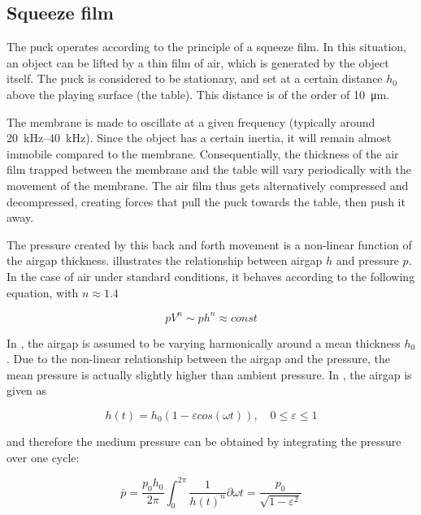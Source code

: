 \subsection{Squeeze film}
\label{sub:squeezefilm}

The puck operates according to the principle of a squeeze film. In this
situation, an object can be lifted by a thin film of air, which is generated by
the object itself. The puck is considered to be stationary, and set at a certain
distance $h_0$ above the playing surface (the table). This distance is of the
order of \SI{10}{\micro\metre}.

The membrane is made to oscillate at a given frequency (typically around
\SIrange{20}{40}{\kilo\hertz}). Since the object has a certain inertia, it will
remain almost immobile compared to the membrane. Consequentially, the thickness
of the air film trapped between the membrane and the table will vary
periodically with the movement of the membrane. The air film thus gets
alternatively compressed and decompressed, creating forces that pull the puck
towards the table, then push it away. 

The pressure created by this back and forth movement is a non-linear function of
the airgap thickness.  illustrates the
relationship between airgap $h$ and pressure $p$. In the case of air under
standard conditions, it behaves according to the following equation, with $n
\approx 1.4$

\begin{equation}
  pV^{n} \sim ph^{n} \approx const
  \label{eqn:pv-ph}
\end{equation}

In , the airgap is assumed to be varying
harmonically around a mean thickness $h_0$. Due to the non-linear relationship
between the airgap and the pressure, the mean pressure is actually slightly
higher than ambient pressure. In \cite{wiesendanger2001}, the airgap is given as

\begin{equation}
  h(t) = h_0 (1 - \varepsilon cos(\omega t)), \quad 0 \leq \varepsilon \leq 1
  \label{eqn:airgap-periodic}
\end{equation}

and therefore the medium pressure can be obtained by integrating the pressure
over one cycle:

\begin{equation}
  \bar{p} = 
  \frac{p_0 h_0}{2\pi} \int_{0}^{2\pi}\!\frac{1}{h(t)^n} \partial \omega t = 
  \frac{p_0}{\sqrt{1-\varepsilon^2}}
  \label{eqn:pmean}
\end{equation}

